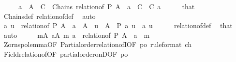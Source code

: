 \begin{isabellebody}
%
\isadelimproof
%
\endisadelimproof
%
\isatagproof
{}\isamarkupfalse%
\ {\isacharminus}{\kern0pt}\isanewline
\ \ \isamarkupfalse%
\ {\isachardoublequoteopen}a\ {\isasymin}\ A{\isachardoublequoteclose}\ \ {\isachardoublequoteopen}C\ {\isasymin}\ Chains\ {\isacharparenleft}{\kern0pt}relation{\isacharunderscore}{\kern0pt}of\ P\ A{\isacharparenright}{\kern0pt}{\isachardoublequoteclose}\ \ {\isachardoublequoteopen}a\ {\isasymin}\ C{\isachardoublequoteclose}\ \ C\ a\isanewline
\ \ \ \ \isamarkupfalse%
\ that\ \isamarkupfalse%
\ Chains{\isacharunderscore}{\kern0pt}def\ relation{\isacharunderscore}{\kern0pt}of{\isacharunderscore}{\kern0pt}def\ \isamarkupfalse%
\ auto\isanewline
\ \ \isamarkupfalse%
\ \isamarkupfalse%
\ {\isachardoublequoteopen}{\isacharparenleft}{\kern0pt}a{\isacharcomma}{\kern0pt}\ u{\isacharparenright}{\kern0pt}\ {\isasymin}\ relation{\isacharunderscore}{\kern0pt}of\ P\ A{\isachardoublequoteclose}\ \ {\isachardoublequoteopen}a\ {\isasymin}\ A{\isachardoublequoteclose}\ \ {\isachardoublequoteopen}u\ {\isasymin}\ A{\isachardoublequoteclose}\ \ {\isachardoublequoteopen}P\ a\ u{\isachardoublequoteclose}\ \ a\ u\isanewline
\ \ \ \ \isamarkupfalse%
\ relation{\isacharunderscore}{\kern0pt}of{\isacharunderscore}{\kern0pt}def\ \isamarkupfalse%
\ that\ \isamarkupfalse%
\ auto\isanewline
\ \ \isamarkupfalse%
\ \isamarkupfalse%
\ {\isachardoublequoteopen}{\isasymexists}m{\isasymin}A{\isachardot}{\kern0pt}\ {\isasymforall}a{\isasymin}A{\isachardot}{\kern0pt}\ {\isacharparenleft}{\kern0pt}m{\isacharcomma}{\kern0pt}\ a{\isacharparenright}{\kern0pt}\ {\isasymin}\ relation{\isacharunderscore}{\kern0pt}of\ P\ A\ {\isasymlongrightarrow}\ a\ {\isacharequal}{\kern0pt}\ m{\isachardoublequoteclose}\isanewline
\ \ \ \ \isamarkupfalse%
\ Zorns{\isacharunderscore}{\kern0pt}po{\isacharunderscore}{\kern0pt}lemma{\isacharbrackleft}{\kern0pt}OF\ Partial{\isacharunderscore}{\kern0pt}order{\isacharunderscore}{\kern0pt}relation{\isacharunderscore}{\kern0pt}ofI{\isacharbrackleft}{\kern0pt}OF\ po{\isacharbrackright}{\kern0pt}{\isacharcomma}{\kern0pt}\ rule{\isacharunderscore}{\kern0pt}format{\isacharbrackright}{\kern0pt}\ ch\isanewline
\ \ \ \ \isamarkupfalse%
\ Field{\isacharunderscore}{\kern0pt}relation{\isacharunderscore}{\kern0pt}of{\isacharbrackleft}{\kern0pt}OF\ partial{\isacharunderscore}{\kern0pt}order{\isacharunderscore}{\kern0pt}onD{\isacharparenleft}{\kern0pt}{}{\isacharparenright}{\kern0pt}{\isacharbrackleft}{\kern0pt}OF\ po{\isacharbrackright}{\kern0pt}{\isacharbrackright}{\kern0pt}\ \isamarkupfalse%

\end{isabellebody}
